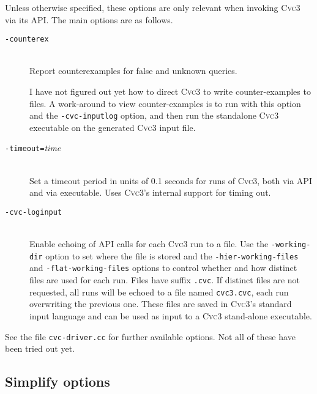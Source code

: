 \documentclass[12pt,fleqn]{article}
\newcommand{\cvcthree}{\textsc{Cvc}3}
\newcommand{\smtlib}{\textsc{smt-lib}}
\newcommand{\optionb}[1]{\item[\texttt{-{#1}}]\ \\}
\newcommand{\optionv}[2]{\item[\texttt{-{#1}=}\mdseries\textit{#2}]\ \\}
\begin{document}
Unless otherwise specified, these options are only relevant when invoking
\cvcthree{} via its API.
%
The main options are as follows.
\begin{description}
\optionb{counterex}
   Report counterexamples for false and unknown queries. 

\begin{remark}
I have not figured out yet how to direct \cvcthree{} to write counter-examples
to files.   A work-around to view counter-examples is to run with 
this option and the \texttt{-cvc-inputlog} option, and then run the
standalone \cvcthree{} executable on the generated \cvcthree{} input file.
\end{remark}



\optionv{timeout}{time}
  Set a timeout period in units of 0.1 seconds for runs of \cvcthree{}, both
  via API and via executable.  Uses \cvcthree{}'s internal support for
  timing out.
  
\optionb{cvc-loginput}
  Enable echoing of API calls for each \cvcthree{} run to a file. 
  Use the \texttt{-working-dir} option to set where the file is stored
  and the 
  \texttt{-hier-working-files} and \texttt{-flat-working-files} options
  to control whether and how distinct files are used for each run. 
  Files have suffix \texttt{.cvc}.
  If distinct files are not requested,
  all runs will be echoed to a file named \texttt{cvc3.cvc},
  each run overwriting the previous one.
  These files are saved in \cvcthree{}'s standard input language and can be 
  used as input to a \cvcthree{} stand-alone executable.

\end{description}
See the file \texttt{cvc-driver.cc} for further available options.  Not
all of these have been tried out yet.


\subsection{Simplify options}
\end{document}
